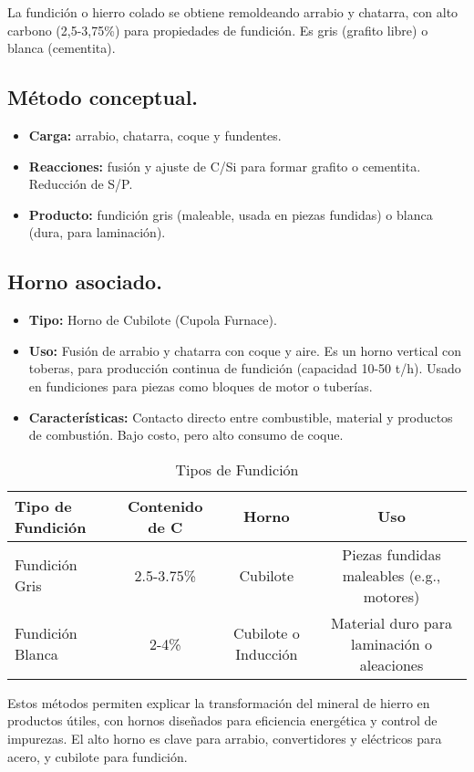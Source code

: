 \documentclass[12pt,a4paper]{article}
\begin{document}
La fundición o hierro colado se obtiene remoldeando arrabio y chatarra, con alto carbono (2,5-3,75\%) para propiedades de fundición. Es gris (grafito libre) o blanca (cementita).

\subsection{Método conceptual.}

\begin{itemize}
    \item \textbf{Carga:} arrabio, chatarra, coque y fundentes.
    \item \textbf{Reacciones:} fusión y ajuste de C/Si para formar grafito o cementita. Reducción de S/P.
    \item \textbf{Producto:} fundición gris (maleable, usada en piezas fundidas) o blanca (dura, para laminación).
\end{itemize}

\subsection{Horno asociado.}

\begin{itemize}
    \item \textbf{Tipo:} Horno de Cubilote (Cupola Furnace).
    \item \textbf{Uso:} Fusión de arrabio y chatarra con coque y aire. Es un horno vertical con toberas, para producción continua de fundición (capacidad 10-50 t/h). Usado en fundiciones para piezas como bloques de motor o tuberías.
    \item \textbf{Características:} Contacto directo entre combustible, material y productos de combustión. Bajo costo, pero alto consumo de coque.
\end{itemize}

\begin{table}[h]
    \centering
    \caption{Tipos de Fundición}
    \begin{tabular}{|l|c|c|c|}
        \hline
        Tipo de Fundición & Contenido de C & Horno & Uso \\ \hline
        Fundición Gris & 2.5-3.75\% & Cubilote & Piezas fundidas maleables (e.g., motores) \\
        Fundición Blanca & 2-4\% & Cubilote o Inducción & Material duro para laminación o aleaciones \\ \hline
    \end{tabular}
\end{table}

Estos métodos permiten explicar la transformación del mineral de hierro en productos útiles, con hornos diseñados para eficiencia energética y control de impurezas. El alto horno es clave para arrabio, convertidores y eléctricos para acero, y cubilote para fundición.
\end{document}

